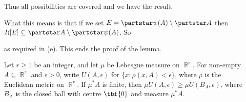 {Thus all possibilities are covered and we have the result.\ \Qed

\medskip

 What this means is that if we set
$E=\partstar\psi(A)\setminus\partstar A$
then $R[E]\subseteq\partstar A\setminus\partstar\psi(A)$.   So


\noindent as required in (e).   This ends the proof of the lemma.
}%

 Let $r\ge 1$ be an integer, and let $\mu$ be
Lebesgue measure on $\BbbR^r$.   For non-empty $A\subseteq\BbbR^r$ and
$\epsilon>0$, write $U(A,\epsilon)$ for $\{x:\rho(x,A)<\epsilon\}$,
where $\rho$ is the Euclidean metric on $\BbbR^r$.   If $\mu^*A$ is
finite, then $\mu U(A,\epsilon)\ge\mu U(B_A,\epsilon)$, where $B_A$ is
the closed ball with centre $\tbf{0}$ and measure $\mu^*A$.

